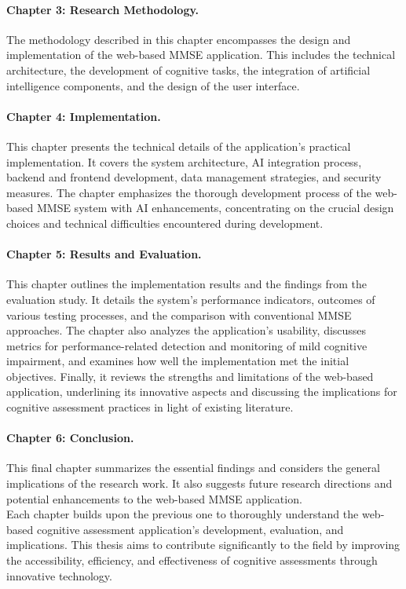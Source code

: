 \paragraph{Chapter 3: Research Methodology.} The methodology described in this chapter encompasses the design and implementation of the web-based MMSE application. This includes the technical architecture, the development of cognitive tasks, the integration of artificial intelligence components, and the design of the user interface.

\paragraph{Chapter 4: Implementation.} This chapter presents the technical details of the application's practical implementation. It covers the system architecture, AI integration process, backend and frontend development, data management strategies, and security measures. The chapter emphasizes the thorough development process of the web-based MMSE system with AI enhancements, concentrating on the crucial design choices and technical difficulties encountered during development.

\paragraph{Chapter 5: Results and Evaluation.} This chapter outlines the implementation results and the findings from the evaluation study. It details the system's performance indicators, outcomes of various testing processes, and the comparison with conventional MMSE approaches. The chapter also analyzes the application's usability, discusses metrics for performance-related detection and monitoring of mild cognitive impairment, and examines how well the implementation met the initial objectives. Finally, it reviews the strengths and limitations of the web-based application, underlining its innovative aspects and discussing the implications for cognitive assessment practices in light of existing literature.

\paragraph{Chapter 6: Conclusion.} This final chapter summarizes the essential findings and considers the general implications of the research work. It also suggests future research directions and potential enhancements to the web-based MMSE application.\\

Each chapter builds upon the previous one to thoroughly understand the web-based cognitive assessment application's development, evaluation, and implications. This thesis aims to contribute significantly to the field by improving the accessibility, efficiency, and effectiveness of cognitive assessments through innovative technology.